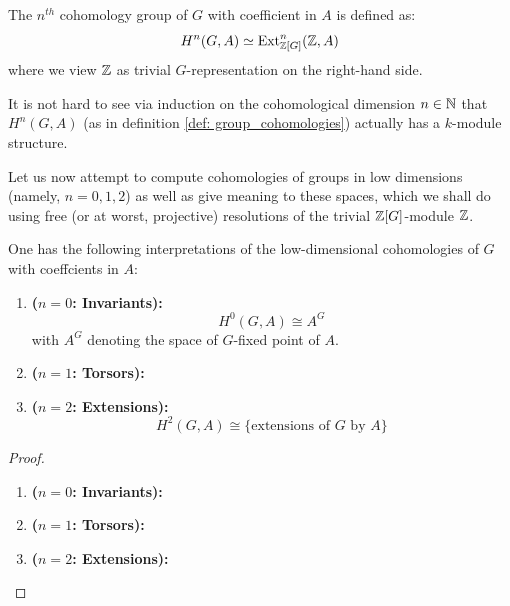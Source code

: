                     \begin{definition} \label{def: group_cohomologies}
                        The $n^{th}$ cohomology group of $G$ with coefficient in $A$ is defined as:
                            $$H^n(G, A) \simeq \mathrm{Ext}^n_{\mathbb{Z}[G]}(\mathbb{Z}, A)$$
                        where we view $\mathbb{Z}$ as trivial $G$-representation on the right-hand side. 
                    \end{definition}
                    \begin{remark}
                        It is not hard to see via induction on the cohomological dimension $n \in \mathbb{N}$ that $H^n(G, A)$ (as in definition \ref{def: group_cohomologies}) actually has a $k$-module structure.
                    \end{remark}
                    
                    Let us now attempt to compute cohomologies of groups in low dimensions (namely, $n = 0, 1, 2$) as well as give meaning to these spaces, which we shall do using free (or at worst, projective) resolutions of the trivial $\mathbb{Z}[G]$-module $\mathbb{Z}$.
                    \begin{proposition} \label{prop: low_dimensional_cohomologies_of_groups}
                        One has the following interpretations of the low-dimensional cohomologies of $G$ with coeffcients in $A$:
                        \begin{enumerate}
                            \item \textbf{($n = 0$: Invariants):}
                                $$H^0(G, A) \cong A^G$$
                            with $A^G$ denoting the space of $G$-fixed point of $A$.
                            \item \textbf{($n = 1$: Torsors):} 
                            \item \textbf{($n = 2$: Extensions):} 
                                $$H^2(G, A) \cong \{\text{extensions of $G$ by $A$}\}$$
                        \end{enumerate}
                    \end{proposition}
                        \begin{proof}
                            \noindent
                            \begin{enumerate}
                                \item \textbf{($n = 0$: Invariants):}
                                \item \textbf{($n = 1$: Torsors):}
                                \item \textbf{($n = 2$: Extensions):}
                            \end{enumerate}
                        \end{proof}
                    \begin{example}
                                    
                    \end{example}
                
